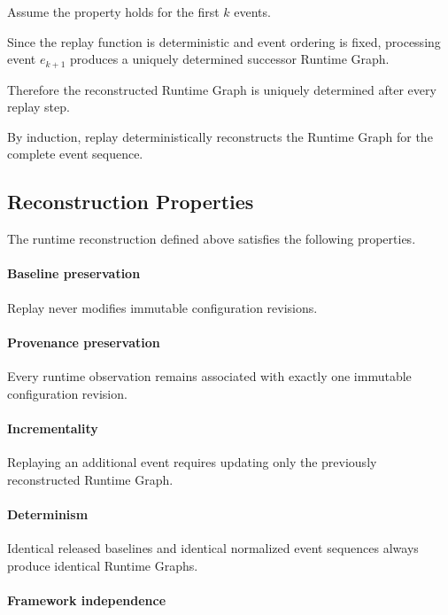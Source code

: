 \documentclass[10pt]{article}
\begin{document}
Assume the property holds for the first $k$ events.

Since the replay function is deterministic and event ordering is fixed,
processing event $e_{k+1}$ produces a uniquely determined successor Runtime
Graph.

Therefore the reconstructed Runtime Graph is uniquely determined after every
replay step.

By induction, replay deterministically reconstructs the Runtime Graph for the
complete event sequence.

\subsection{Reconstruction Properties}
\label{appendix:runtime_properties}

The runtime reconstruction defined above satisfies the following properties.

\paragraph*{Baseline preservation}

Replay never modifies immutable configuration revisions.

\paragraph*{Provenance preservation}

Every runtime observation remains associated with exactly one immutable
configuration revision.

\paragraph*{Incrementality}

Replaying an additional event requires updating only the previously
reconstructed Runtime Graph.

\paragraph*{Determinism}

Identical released baselines and identical normalized event sequences always
produce identical Runtime Graphs.

\paragraph*{Framework independence}
\end{document}
